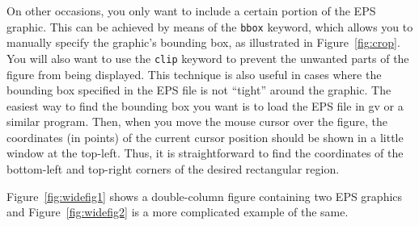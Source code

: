 \documentclass[debug]{rmaa}
\newcommand{\CS}[1]{\texttt{\textbackslash #1}}
\begin{document}
On other occasions, you only want to include a certain portion of the
EPS graphic. This can be achieved by means of the \texttt{bbox}
keyword, which allows you to manually specify the graphic's bounding
box, as illustrated in Figure~\ref{fig:crop}. You will also want to
use the \texttt{clip} keyword to prevent the unwanted parts of the
figure from being displayed. This technique is also useful in cases
where the bounding box specified in the EPS file is not ``tight''
around the graphic. The easiest way to find the bounding box you want
is to load the EPS file in gv or a similar program. Then, when you
move the mouse cursor over the figure, the coordinates (in points) of
the current cursor position should be shown in a little window at the
top-left. Thus, it is straightforward to find the coordinates of the
bottom-left and top-right corners of the desired rectangular region.



Figure~\ref{fig:widefig1} shows a double-column figure containing two
EPS graphics and Figure~\ref{fig:widefig2} is a more complicated
example of the same. 
\end{document}
